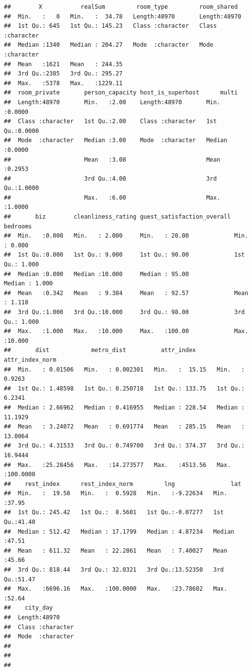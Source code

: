 \documentclass[
]{article}
\begin{document}
\begin{verbatim}
##        X           realSum         room_type         room_shared       
##  Min.   :   0   Min.   :  34.78   Length:48970       Length:48970      
##  1st Qu.: 645   1st Qu.: 145.23   Class :character   Class :character  
##  Median :1340   Median : 204.27   Mode  :character   Mode  :character  
##  Mean   :1621   Mean   : 244.35                                        
##  3rd Qu.:2385   3rd Qu.: 295.27                                        
##  Max.   :5378   Max.   :1229.11                                        
##  room_private       person_capacity host_is_superhost      multi       
##  Length:48970       Min.   :2.00    Length:48970       Min.   :0.0000  
##  Class :character   1st Qu.:2.00    Class :character   1st Qu.:0.0000  
##  Mode  :character   Median :3.00    Mode  :character   Median :0.0000  
##                     Mean   :3.08                       Mean   :0.2953  
##                     3rd Qu.:4.00                       3rd Qu.:1.0000  
##                     Max.   :6.00                       Max.   :1.0000  
##       biz        cleanliness_rating guest_satisfaction_overall    bedrooms     
##  Min.   :0.000   Min.   : 2.000     Min.   : 20.00             Min.   : 0.000  
##  1st Qu.:0.000   1st Qu.: 9.000     1st Qu.: 90.00             1st Qu.: 1.000  
##  Median :0.000   Median :10.000     Median : 95.00             Median : 1.000  
##  Mean   :0.342   Mean   : 9.384     Mean   : 92.57             Mean   : 1.118  
##  3rd Qu.:1.000   3rd Qu.:10.000     3rd Qu.: 98.00             3rd Qu.: 1.000  
##  Max.   :1.000   Max.   :10.000     Max.   :100.00             Max.   :10.000  
##       dist            metro_dist          attr_index      attr_index_norm   
##  Min.   : 0.01506   Min.   : 0.002301   Min.   :  15.15   Min.   :  0.9263  
##  1st Qu.: 1.48598   1st Qu.: 0.250718   1st Qu.: 133.75   1st Qu.:  6.2341  
##  Median : 2.66962   Median : 0.416955   Median : 228.54   Median : 11.1929  
##  Mean   : 3.24072   Mean   : 0.691774   Mean   : 285.15   Mean   : 13.0064  
##  3rd Qu.: 4.31533   3rd Qu.: 0.749700   3rd Qu.: 374.37   3rd Qu.: 16.9444  
##  Max.   :25.28456   Max.   :14.273577   Max.   :4513.56   Max.   :100.0000  
##    rest_index      rest_index_norm         lng                lat       
##  Min.   :  19.58   Min.   :  0.5928   Min.   :-9.22634   Min.   :37.95  
##  1st Qu.: 245.42   1st Qu.:  8.5601   1st Qu.:-0.07277   1st Qu.:41.40  
##  Median : 512.42   Median : 17.1799   Median : 4.87234   Median :47.51  
##  Mean   : 611.32   Mean   : 22.2861   Mean   : 7.40027   Mean   :45.66  
##  3rd Qu.: 818.44   3rd Qu.: 32.0321   3rd Qu.:13.52350   3rd Qu.:51.47  
##  Max.   :6696.16   Max.   :100.0000   Max.   :23.78602   Max.   :52.64  
##    city_day        
##  Length:48970      
##  Class :character  
##  Mode  :character  
##                    
##                    
## 
\end{verbatim}
\end{document}
